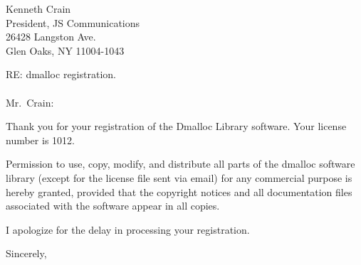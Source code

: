 

%
%

%
%
\address{Dmalloc Software \\
330 Harmar St. \\
Pittsburgh, PA  15219-3748 \\
1.412.687.3221}

\signature{Gray Watson \\
gray@letters.com}

\date{December 28, 1995}


\begin{letter}{Kenneth Crain \\
President, JS Communications \\
26428 Langston Ave. \\
Glen Oaks, NY 11004-1043}

\opening{RE: dmalloc registration. \\
 \\
Mr.\ Crain:}

Thank you for your registration of the Dmalloc Library software.  Your
license number is 1012.

Permission to use, copy, modify, and distribute all parts of the
dmalloc software library (except for the license file sent via email)
for any commercial purpose is hereby granted, provided that the
copyright notices and all documentation files associated with the
software appear in all copies.

I apologize for the delay in processing your registration.

\closing{Sincerely,}

\end{letter}

